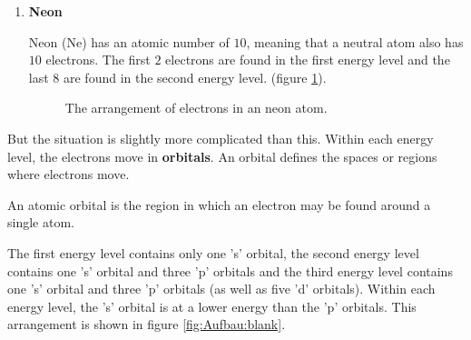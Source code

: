 \begin{enumerate}[noitemsep, label=\textbf{\arabic*}. ]
\item{\textbf{Neon} \\
\begin{minipage}{.4\textwidth}
Neon ($\text{Ne}$) has an atomic number of $10$, meaning that a neutral atom also has $10$ electrons. The first $2$ electrons are found in the first energy level and the last $8$ are found in the second energy level. (figure \ref{fig:atom:neon}).
\end{minipage}
\begin{minipage}{.6\textwidth}
\begin{figure}[H]
\begin{center}
\caption{The arrangement of electrons in an neon atom.}
\label{fig:atom:neon}
\end{center}
\end{figure}
\end{minipage}
}
\end{enumerate}


\label{m38741*id259478}But the situation is slightly more complicated than this. Within each energy level, the electrons move in \textbf{orbitals}. An orbital defines the spaces or regions where electrons move.

 {An atomic orbital is the region in which an electron may be found around a single atom.} 

The first energy level contains only one 's' orbital, the second energy level contains one 's' orbital and three 'p' orbitals and the third energy level contains one 's' orbital and three 'p' orbitals (as well as five 'd' orbitals). Within each energy level, the 's' orbital is at a lower energy than the 'p' orbitals. This arrangement is shown in figure \ref{fig:Aufbau:blank}. 

